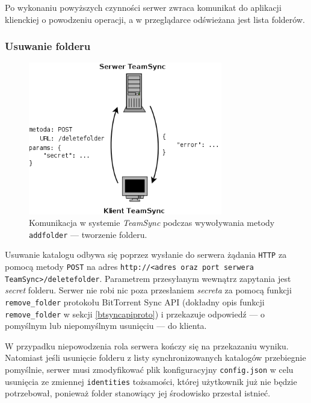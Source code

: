 \documentclass[polish,a4paper,twoside]{ppfcmthesis}
\begin{document}
Po wykonaniu powyższych czynności serwer zwraca komunikat do aplikacji klienckiej o powodzeniu operacji, a w przeglądarce odświeżana jest lista folderów.

\subsubsection*{Usuwanie folderu}

\begin{figure}[h!]
  \vspace{5pt}
  \begin{center}
    \includegraphics[width=240pt]{figures/metdeletefolder.png}
  \end{center}
  \caption{Komunikacja w systemie \emph{TeamSync} podczas wywoływania metody \texttt{addfolder} --- tworzenie folderu.}
  \label{picmetdeletefolder}
\end{figure}

Usuwanie katalogu odbywa się poprzez wysłanie do serwera żądania \texttt{HTTP} za pomocą metody \texttt{POST} na adres \texttt{http://<adres oraz port serwera TeamSync>\-/deletefolder}. Parametrem przesyłanym wewnątrz zapytania jest \emph{secret} folderu. Serwer nie robi nic poza przesłaniem \emph{secreta} za pomocą funkcji \texttt{remove\_folder} protokołu BitTorrent Sync API (dokładny opis funkcji \texttt{remove\_folder} w sekcji \ref{btsyncapiproto}) i  przekazuje odpowiedź --- o pomyślnym lub niepomyślnym usunięciu --- do klienta.

W przypadku niepowodzenia rola serwera kończy się na przekazaniu wyniku. Natomiast jeśli usunięcie folderu z listy synchronizowanych katalogów przebiegnie pomyślnie, serwer musi zmodyfikować plik konfiguracyjny \texttt{config.json} w celu usunięcia ze zmiennej \texttt{identities} tożsamości, której użytkownik już nie będzie potrzebował, ponieważ folder stanowiący jej środowisko przestał istnieć.
\end{document}
